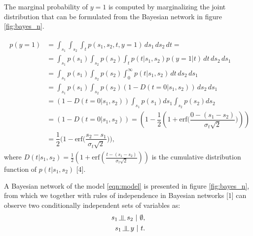 \documentclass{article}
\newcommand{\indep}{\rotatebox[origin=c]{90}{$\models$}}
\begin{document}
	The marginal probability of $ y=1 $ is computed by marginalizing the joint distribution that can be formulated from the Bayesian network in figure \ref{fig:bayes_n}.
	
	\begin{align}
	\begin{split}
	p(y=1) 	&= \int_{s_1}\int_{s_2}\int_t p(s_1, s_2, t, y=1)\,ds_1\,ds_2\,dt=\\
			&= \int_{s_1}p(s_1)\int_{s_2}p(s_2)\int_t p(t|s_1,s_2)p(y=1|t)\,dt\,ds_2\,ds_1\\
			&= \int_{s_1}p(s_1)\int_{s_2}p(s_2)\int_0^\infty p(t|s_1,s_2)\,dt\,ds_2\,ds_1\\
			&= \int_{s_1}p(s_1)\int_{s_2}p(s_2) (1 - D(t=0|s_1,s_2))\,ds_2\,ds_1\\
			&= (1-D(t=0|s_1,s_2))\int_{s_1}p(s_1)ds_1\int_{s_2}p(s_2)ds_2\\
			&= (1-D(t=0|s_1,s_2)) = (1 - \dfrac{1}{2}(1+\text{erf}\Big(\dfrac{0-(s_1-s_2)}{\sigma_t\sqrt{2}}\Big)))\\
			&= \dfrac{1}{2}\Big(1 - \text{erf}\Big(\dfrac{s_2-s_1}{\sigma_t\sqrt{2}}\Big)\Big),
	\end{split}
	\end{align}
	where $ D(t|s_1,s_2) = \frac{1}{2}(1+\text{erf}(\frac{t-(s_1-s_2)}{\sigma_t\sqrt{2}}))$ is the cumulative distribution function of $p(t|s_1,s_2)$ [4].
	
	A Bayesian network of the model \eqref{eqn:model} is presented in figure \ref{fig:bayes_n}, from which we together with rules of independence in Bayesian networks [1] can observe two conditionally independent sets of variables as:
	\begin{align}
		s_1 \,\indep \, s_2 ~|~ \emptyset, \\
		s_1 \,\indep \, y ~|~ t.
	\end{align}
	
\end{document}
